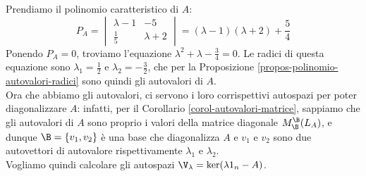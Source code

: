 \documentclass[11pt, a4paper, titlepage, oneside]{scrbook}
\begin{document}
Prendiamo il polinomio caratteristico di $A$:
\[
P_A = \begin{vmatrix}
    \lambda - 1 & -5 \\
    \frac{1}{5} & \lambda + 2
\end{vmatrix} = (\lambda -1)(\lambda + 2) + \frac{5}{4}
\]
Ponendo $P_A = 0$, troviamo l'equazione $\lambda^2 + \lambda - \frac{3}{4} = 0$. Le radici di questa equazione sono $\lambda_1 = \frac{1}{2}$ e $\lambda_2 = -\frac{3}{2}$, che per la Proposizione \ref{propos-polinomio-autovalori-radici} sono quindi gli autovalori di $A$. \\
Ora che abbiamo gli autovalori, ci servono i loro corrispettivi autospazi per poter diagonalizzare $A$: infatti, per il Corollario \ref{corol-autovalori-matrice}, sappiamo che gli autovalori di $A$ sono proprio i valori della matrice diagonale $M_\B^\B(L_A)$, e dunque $\B = \{v_1, v_2\}$ è una base che diagonalizza $A$ e $v_1$ e $v_2$ sono due autovettori di autovalore rispettivamente $\lambda_1$ e $\lambda_2$. \\
Vogliamo quindi calcolare gli autospazi $\V_\lambda = \ker (\lambda 1_n - A)$.
\end{document}
